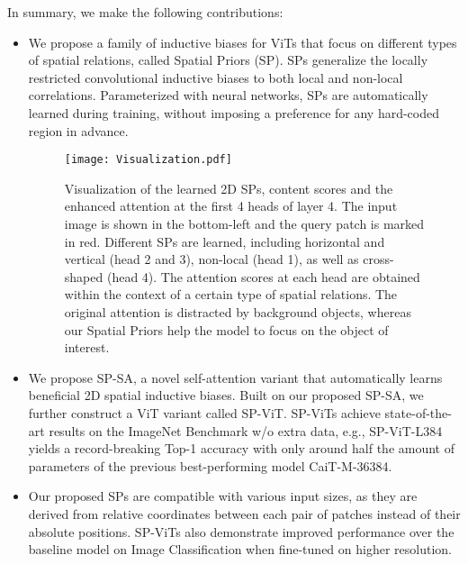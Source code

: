 \documentclass[authorversion, sigconf, acmthm=false, nonacm=true]{acmart}
\begin{document}
In summary, we make the following contributions:
\begin{itemize}
\item We propose a family of inductive biases for ViTs 
that focus on different types of spatial relations, called Spatial Priors (SP). SPs generalize the
locally restricted convolutional inductive biases
to both local and non-local correlations. Parameterized with neural networks, SPs are automatically learned
during training, without imposing a preference for any hard-coded region in advance.


\begin{figure*}[t]
  \centering
  \texttt{[image: Visualization.pdf]} \caption{Visualization of the learned 2D SPs, content scores and the enhanced attention at the first 4 heads of layer 4. The input image is shown
  in the bottom-left and the query patch is marked in red. Different SPs are learned, including
  horizontal and vertical (head 2 and 3), non-local (head 1), as well as cross-shaped (head 4).
  The attention scores at each head are obtained within the context of a certain type of spatial relations. The original attention is distracted by background objects, whereas our Spatial Priors help the model to focus on the object of interest.} 
  \label{fig3}
\end{figure*}

\item We propose SP-SA, a novel self-attention variant that automatically learns 
beneficial 2D spatial inductive biases. Built on our proposed SP-SA, we further construct a ViT variant called SP-ViT.
SP-ViTs achieve state-of-the-art results on the ImageNet Benchmark w/o extra data, e.g., SP-ViT-L384 yields a record-breaking 
Top-1 accuracy with only around half the amount of parameters of the previous best-performing model CaiT-M-36384. 

\item Our proposed SPs 
are compatible with various input sizes, as they are derived from relative coordinates between each pair of patches instead of their absolute positions. SP-ViTs also demonstrate improved performance over the baseline model on Image Classification when fine-tuned on higher resolution. 




  

\end{itemize}
\end{document}
